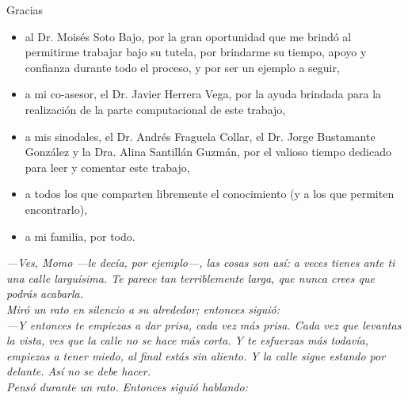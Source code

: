\thispagestyle{empty} %


\vspace*{\fill}
\begingroup
\centering

Gracias

\begin{itemize}
\item al Dr. Moisés Soto Bajo, por 
la gran oportunidad que me brindó al permitirme trabajar
bajo su tutela,
por brindarme su tiempo, apoyo y confianza durante todo el proceso,
y por ser un ejemplo a seguir,

\item a mi co-asesor, el Dr. Javier Herrera Vega, por 
la ayuda brindada para la realización de la parte 
computacional de este trabajo,

\item a mis sinodales, el
Dr. Andrés Fraguela Collar, 
el Dr. Jorge Bustamante González
y la Dra. Alina Santillán Guzmán, por 
el valioso tiempo dedicado
para leer y comentar este trabajo, 

\item a todos los que comparten libremente
el conocimiento (y a los que permiten encontrarlo),

\item a mi familia, por todo.
\end{itemize} 

\endgroup
\vspace*{\fill}


\newpage
\thispagestyle{empty}
\vspace*{\fill}
\begingroup


\textit{
—Ves, Momo —le decía, por ejemplo—, las cosas son así: a veces tienes ante ti una calle larguísima. Te parece tan terriblemente larga, que nunca crees que podrás acabarla.} \\

\textit{ 
Miró un rato en silencio a su alrededor; entonces siguió:} \\

\textit{ 
—Y entonces te empiezas a dar prisa, cada vez más prisa. Cada vez que levantas la vista, ves que la calle no se hace más corta. Y te esfuerzas más todavía, empiezas a tener miedo, al final estás sin aliento. Y la calle sigue estando por delante. Así no se debe hacer.}\\

\textit{ 
Pensó durante un rato. Entonces siguió hablando:} \\

